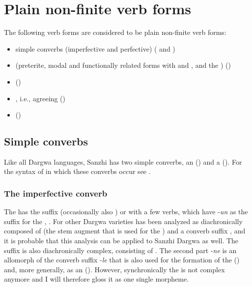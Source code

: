 \section{Plain non-finite verb forms}
\label{sec:Plain non-finite verb forms}

The following verb forms are considered to be plain non-finite verb forms:
%
\begin{itemize}
	\item	simple converbs (imperfective and perfective) ( and )
	\item	{} (preterite, modal and functionally related forms with  and , and the ) ()
	\item	{} ()
	\item	{}, i.e., agreeing  ()
	\item	{} ()
\end{itemize}

%


 

\subsection{Simple converbs}
\label{ssec:Simple converbs}
Like all Dargwa languages, Sanzhi has two simple converbs, an  () and a  (). For the syntax of  in which these converbs occur see .


\subsubsection{The imperfective converb}
\label{sssec:The imperfective converb}

The  has the suffix  (occasionally also ) or with a few verbs, which have -\textit{un} as the suffix for the , . For other Dargwa varieties  has been analyzed as diachronically composed of  (the stem augment that is used for the ) and a converb suffix  \citep{Sumbatova.Mutalov2003, BelyaevInPreparation}, and it is probable that this analysis can be applied to Sanzhi Dargwa as well. The suffix  is also diachronically complex, consisting of . The second part -\textit{ne} is an allomorph of the converb suffix -\textit{le} that is also used for the formation of the  () and, more generally, as an  (). However, synchronically the  is not complex anymore and I will therefore gloss it as one single morpheme.

